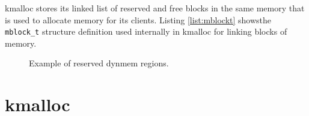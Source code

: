 kmalloc stores its linked list of reserved and free blocks in the same memory
that is used to allocate memory for its clients. Listing \ref{list:mblockt}
showsthe \verb+mblock_t+ structure definition used internally in kmalloc for
linking blocks of memory.

\begin{figure}
  
  \centering
  \caption{Example of reserved dynmem regions.}
  \label{figure:dynmem_blocks}
\end{figure}



\chapter{kmalloc}
